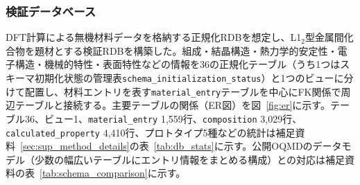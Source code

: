 \documentclass[twocolumn]{interact}
\begin{document}
\subsubsection{検証データベース}

DFT計算による無機材料データを格納する正規化RDBを想定し、L1$_2$型金属間化合物を題材とする検証RDBを構築した。組成・結晶構造・熱力学的安定性・電子構造・機械的特性・表面特性などの情報を36の正規化テーブル（うち1つはスキーマ初期化状態の管理表\texttt{schema\_initialization\_status}）と1つのビューに分けて配置し、材料エントリを表す\texttt{material\_entry}テーブルを中心にFK関係で周辺テーブルと接続する。主要テーブルの関係（ER図）を図~\ref{fig:er}に示す。テーブル36、ビュー1、\texttt{material\_entry} 1{,}559行、\texttt{composition} 3{,}029行、\texttt{calculated\_property} 4{,}410行、プロトタイプ5種などの統計は補足資料~\ref{sec:sup_method_details}の表~\ref{tab:db_stats}に示す。公開OQMDのデータモデル（少数の幅広いテーブルにエントリ情報をまとめる構成）との対応は補足資料の表~\ref{tab:schema_comparison}に示す。
\end{document}
